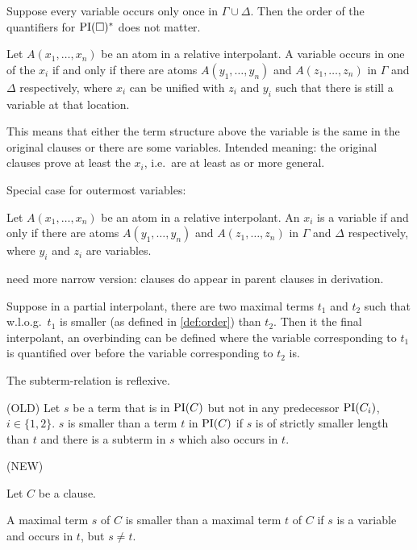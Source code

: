 
\begin{conj}
	Suppose every variable occurs only once in $\Gamma \cup \Delta$.
	Then the order of the quantifiers for $\mathrm{PI}(\square)^*$ does not matter.
\end{conj}
\begin{prop}

	Let $A(x_1, \ldots, x_n)$ be an atom in a relative interpolant.
	A variable occurs in one of the $x_i$ if and only if there are atoms $A(y_1, \ldots, y_n)$ and $A(z_1, \ldots, z_n)$ in $\Gamma$ and $\Delta$ respectively, where $x_i$ can be unified with $z_i$ and $y_i$ such that there is still a variable at that location.

	This means that either the term structure above the variable is the same in the original clauses or there are some variables. Intended meaning: the original clauses prove at least the $x_i$, i.e.~are at least as or more general.
	\medskip

	Special case for outermost variables:

	Let $A(x_1, \ldots, x_n)$ be an atom in a relative interpolant.
	An $x_i$ is a variable if and only if there are atoms $A(y_1, \ldots, y_n)$ and $A(z_1, \ldots, z_n)$ in $\Gamma$ and $\Delta$ respectively, where $y_i$ and $z_i$ are variables.
\end{prop}

need more narrow version: clauses do appear in parent clauses in derivation.



\begin{prop}
	Suppose in a partial interpolant, there are two maximal terms $t_1$ and $t_2$ such that w.l.o.g.~$t_1$ is smaller (as defined in \ref{def:order}) than $t_2$. Then it the final interpolant, an overbinding can be defined where the variable corresponding to $t_1$ is quantified over before the variable corresponding to $t_2$ is.
\end{prop}

The subterm-relation is reflexive.

\begin{defi}


	(OLD)
	Let $s$ be a term that is in $\mathrm{PI}(C)$ but not in any predecessor $\mathrm{PI}(C_i)$, $i \in \{1,2\}$. $s$ is smaller than a term $t$ in $\mathrm{PI}(C)$ if $s$ is of strictly smaller length than $t$ and there is a subterm in $s$ which also occurs in $t$.
\end{defi}

\begin{defi}
	\label{def:order}
	(NEW)

	Let $C$ be a clause.

	A maximal term $s$ of $C$ is smaller than a maximal term $t$ of $C$ if $s$ is a variable and occurs in $t$, but $s\neq t$. 

\end{defi}

